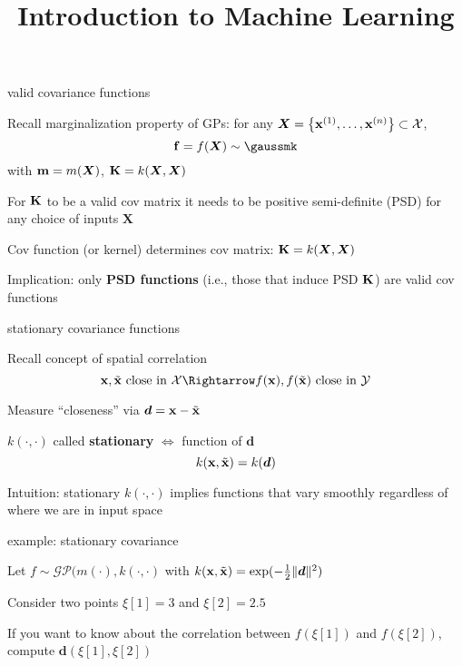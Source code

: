\documentclass[11pt,compress,t,notes=noshow, xcolor=table]{beamer}
\title{Introduction to Machine Learning}
\begin{document}

\begin{framei}[sep=L]{valid covariance functions}
\item Recall marginalization property of GPs: for any $\bm{X} = \left\{ \mathbf{x}^{(1)}, \ldots, \mathbf{x}^{(n)}\right\} \subset \mathcal{X}$,
$$\fv = f(\bm{X}) \sim \gaussmk$$
with $\mathbf{m} = m(\bm{X})$, $\mathbf{K} = k(\bm{X}, \bm{X})$
\item For $\mathbf{K}$ to be a valid cov matrix it needs to be positive semi-definite (PSD) for any choice of inputs $\bm{X}$
\item Cov function (or kernel) determines cov matrix: $\mathbf{K} = k(\bm{X}, \bm{X})$
\item Implication: only \textbf{PSD functions} (i.e., those that induce PSD $\mathbf{K}$) are valid cov functions
\end{framei}

\begin{framei}[sep=L]{stationary covariance functions}
\item Recall concept of spatial correlation
$$\xv, \tilde{\xv} \text{ close in } \Xspace \Rightarrow f(\xv), f(\tilde{\xv}) \text{ close in } \Yspace$$
\item Measure ``closeness'' via $\bm{d} = \mathbf{x} - \tilde{\mathbf{x}}$
\item $k(\cdot, \cdot)$ called \textbf{stationary} $\Leftrightarrow$ function of $\bm{d}$ 
$$k(\mathbf{x}, \tilde{\mathbf{x}}) = k(\bm{d})$$
\item Intuition: stationary $k(\cdot, \cdot)$ implies functions that vary smoothly regardless of where we are in input space
\end{framei}

\begin{framei}{example: stationary covariance}
\item Let $f \sim \mathcal{GP}(m(\cdot), k(\cdot, \cdot)$ with $k(\mathbf{x}, \tilde{\mathbf{x}}) = \exp(-\tfrac{1}{2}\|\bm{d}\|^2)$
\item Consider two points $\xi[1] = 3$ and $\xi[2] = 2.5$
\item If you want to know about the correlation between $f(\xi[1])$ and $f(\xi[2])$, compute $\bm{d}(\xi[1], \xi[2])$
\vfill
{}
\end{framei}
\end{document}
